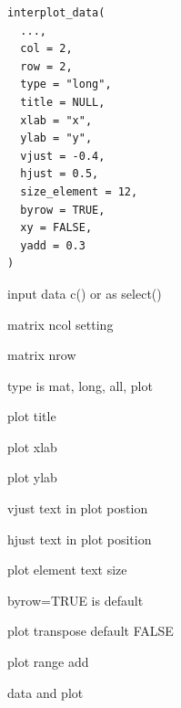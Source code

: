 \documentclass[a4paper]{book}
\begin{document}
%
\begin{Usage}
\begin{verbatim}
interplot_data(
  ...,
  col = 2,
  row = 2,
  type = "long",
  title = NULL,
  xlab = "x",
  ylab = "y",
  vjust = -0.4,
  hjust = 0.5,
  size_element = 12,
  byrow = TRUE,
  xy = FALSE,
  yadd = 0.3
)
\end{verbatim}
\end{Usage}
%
\begin{Arguments}
\begin{ldescription}
\item[\code{...}] input data c() or as select()

\item[\code{col}] matrix ncol setting

\item[\code{row}] matrix nrow

\item[\code{type}] type is mat, long, all, plot

\item[\code{title}] plot title

\item[\code{xlab}] plot xlab

\item[\code{ylab}] plot ylab

\item[\code{vjust}] vjust text in plot postion

\item[\code{hjust}] hjust text in plot position

\item[\code{size\_element}] plot element text size

\item[\code{byrow}] byrow=TRUE is default

\item[\code{xy}] plot transpose default FALSE

\item[\code{yadd}] plot range add
\end{ldescription}
\end{Arguments}
%
\begin{Value}
data and plot
\end{Value}
%
\end{document}
